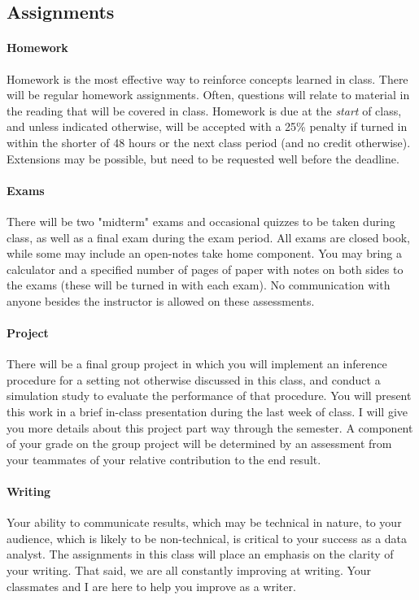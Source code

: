 \documentclass[11pt]{article}
\begin{document}
\subsection*{Assignments}

\paragraph{Homework}
Homework is the most effective way to reinforce concepts learned in class. There will be regular homework assignments. Often, questions will relate to material in the reading that will be covered in class. Homework is due at the \emph{start} of class, and unless indicated otherwise, will be accepted with a 25\% penalty if turned in within the shorter of 48 hours or the next class period (and no credit otherwise).  Extensions may be possible, but need to be requested well before the deadline.

\paragraph{Exams}
There will be two "midterm" exams and occasional quizzes to be taken during class, as well as a final exam during the exam period.  All exams are closed book, while some may include an open-notes take home component.  You may bring a calculator and a specified number of pages of paper with notes on both sides to the exams (these will be turned in with each exam).  No communication with anyone besides the instructor is allowed on these assessments.

\paragraph{Project}
There will be a final group project in which you will implement an inference procedure for a setting not otherwise discussed in this class, and conduct a simulation study to evaluate the performance of that procedure.  You will present this work in a brief in-class presentation during the last week of class.  I will give you more details about this project part way through the semester.  A component of your grade on the group project will be determined by an assessment from your teammates of your relative contribution to the end result.

\paragraph{Writing}
Your ability to communicate results, which may be technical in nature, to your audience, which is likely to be non-technical, is critical to your success as a data analyst. The assignments in this class will place an emphasis on the clarity of your writing.  That said, we are all constantly improving at writing.  Your classmates and I are here to help you improve as a writer.
\end{document}
